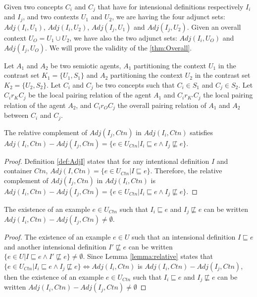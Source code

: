 Given two concepts $C_{i}$ and $C_{j}$ that have for intensional definitions respectively $I_{i}$ and $I_{j}$, and two contexts $U_{1}$ and $U_{2}$, we are having the four adjunct sets: $Adj(I_{i},U_{1})$, $Adj(I_{i},U_{2})$, $Adj(I_{j},U_{1})$ and $Adj(I_{j},U_{2})$. Given an overall context $U_{O} = U_{1} \cup U_{2}$, we have also the two adjunct sets: $Adj(I_{i},U_{O})$ and $Adj(I_{j},U_{O})$. We will prove the validity of the \cref{thm:Overall}.

Let $A_{1}$ and $A_{2}$ be two semiotic agents, $A_{1}$ partitioning the context $U_{1}$ in the contrast set $K_{1} = \{ U_{1}, S_{1} \}$ and $A_{2}$ partitioning the context $U_{2}$ in the contrast set $K_{2} = \{ U_{2}, S_{2}\}$. Let $C_{i}$ and $C_{j}$ be two concepts such that $C_{i} \in S_{1}$ and $C_{j} \in S_{2}$. Let $C_{i} r_{K} C_{j}$ be the local pairing relation of the agent $A_{1}$ and $C_{i} r_{K'} C_{j}$ the local pairing relation of the agent $A_{2}$, and $C_{i} r_{O} C_{j}$ the overall pairing relation of $A_{1}$ and $A_{2}$ between $C_{i}$ and $C_{j}$.

\begin{lemma}\label{lemma:relative}
The relative complement of $Adj(I_{j},Ctn)$ in $Adj(I_{i},Ctn)$ satisfies $Adj(I_{i}, Ctn) - Adj(I_{j}, Ctn) = \{ e \in U_{Ctn} | I_{i} \sqsubseteq e \wedge I_{j} \not \sqsubseteq e  \}$.
\end{lemma}

\begin{proof}
Definition \ref{def:AdjI} states that for any intentional definition $I$ and container $Ctn$, $Adj(I,Ctn) = \{ e \in U_{Ctn} | I \sqsubseteq e \}$. Therefore, the relative complement of $Adj(I_{j},Ctn)$ in $Adj(I_{i},Ctn)$ is $Adj(I_{i}, Ctn) - Adj(I_{j}, Ctn) = \{ e \in U_{Ctn} | I_{i} \sqsubseteq e \wedge I_{j} \not \sqsubseteq e \}$.
\end{proof}

\begin{lemma}\label{lemma:relativeq}
The existence of an example $e \in U_{Ctn}$ such that $I_{i} \sqsubseteq e$ and $I_{j} \not \sqsubseteq e$ can be written $Adj(I_{i}, Ctn) - Adj(I_{j}, Ctn) \neq \emptyset$.
\end{lemma}

\begin{proof}
The existence of an example $e \in U$ such that an intensional definition $I \sqsubseteq e$ and another intensional definition $I' \not \sqsubseteq e$ can be written $\{ e \in U | I \sqsubseteq e \wedge I' \not \sqsubseteq e \} \neq \emptyset$. Since Lemma \ref{lemma:relative} states that $\{ e \in U_{Ctn} | I_{i} \sqsubseteq e \wedge I_{j} \not \sqsubseteq e \} \Leftrightarrow Adj(I_{i},Ctn)$ is $Adj(I_{i}, Ctn) - Adj(I_{j}, Ctn)$, then the existence of an example $e \in U_{Ctn}$ such that $I_{i} \sqsubseteq e$ and $I_{j} \not \sqsubseteq e$ can be written $Adj(I_{i}, Ctn) - Adj(I_{j}, Ctn) \neq \emptyset$
\end{proof}

